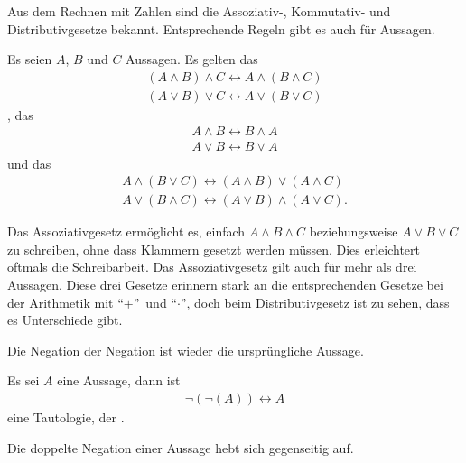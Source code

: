 \begin{Unit}
Aus dem Rechnen mit Zahlen sind die Assoziativ-, Kommutativ- und 
Distributivgesetze bekannt. Entsprechende Regeln gibt es auch für Aussagen.

\begin{Satz}
Es seien $A$, $B$ und $C$ Aussagen. Es gelten das 
\begin{align}
  (A \land  B) \land C \leftrightarrow A \land (B \land C) \\
  (A \lor B) \lor C \leftrightarrow A \lor (B \lor C)
\end{align}
, das 
\begin{align}
  A \land B \leftrightarrow B \land A \\
  A \lor B \leftrightarrow B \lor A
\end{align}
und das 
\begin{align}
  A \land (B \lor C) \leftrightarrow (A \land B) \lor (A \land C) \\
  A \lor (B \land C) \leftrightarrow (A \lor B) \land (A \lor C) .
\end{align}
\end{Satz}

Das Assoziativgesetz ermöglicht es, einfach $A \land B \land C$ 
beziehungsweise $A \lor B \lor C$ zu schreiben, ohne dass Klammern 
gesetzt werden müssen. Dies erleichtert oftmals die Schreibarbeit. Das 
Assoziativgesetz gilt auch für mehr als drei Aussagen. Diese drei Gesetze 
erinnern stark an die entsprechenden Gesetze bei der Arithmetik mit 
\enquote{$+$}\ und \enquote{$\cdot$}, doch beim Distributivgesetz ist 
zu sehen, dass es Unterschiede gibt.
\end{Unit}

\begin{Unit}
Die Negation der Negation ist wieder die ursprüngliche Aussage. 

\begin{Satz}
Es sei $A$ eine Aussage, dann ist
\begin{align} 
  \neg (\neg (A)) \leftrightarrow A
\end{align}
eine Tautologie, der . 
\end{Satz}

Die doppelte Negation einer Aussage hebt sich gegenseitig auf.
\end{Unit}

